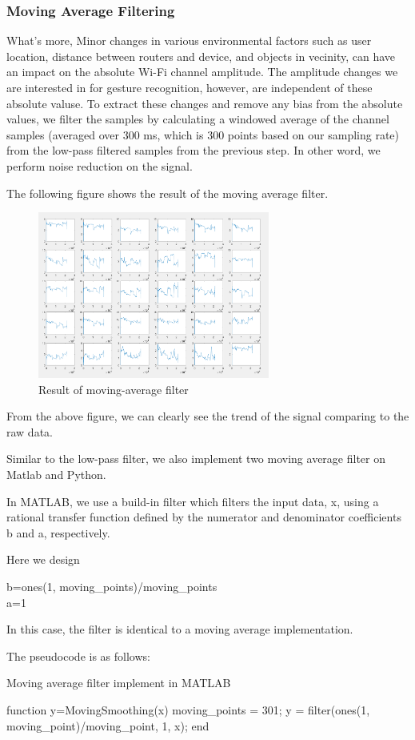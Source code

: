 \documentclass[conference]{IEEEtran}
\begin{document}
\subsubsection{Moving Average Filtering}
What's more, Minor changes in various environmental factors such as user location, distance between routers and device, and objects in vecinity, can have an impact on the absolute Wi-Fi channel amplitude. The amplitude changes we are interested in for gesture recognition, however, are independent of these absolute valuse. To extract these changes and remove any bias from the absolute values, we filter the samples by calculating a windowed average of the channel samples (averaged over 300 ms, which is 300 points based on our sampling rate) from the low-pass filtered samples from the previous step. In other word, we perform noise reduction on the signal.

The following figure shows the result of the moving average filter.
\begin{figure}[H]
\centering
\includegraphics[width=3in]{MAF.png}
\caption{Result of moving-average filter}
\end{figure}
From the above figure, we can clearly see the trend of the signal comparing to the raw data.

Similar to the low-pass filter, we also implement two moving average filter on Matlab and Python.

In MATLAB, we use a build-in filter which filters the input data, x, using a rational transfer function defined by the numerator and denominator coefficients b and a, respectively.

Here we design
\begin{algorithm}[H]
b=ones(1, moving\_points)/moving\_points\\
a=1
\end{algorithm}
In this case, the filter is identical to a moving average implementation.

The pseudocode is as follows:
\begin{algorithm}
	\caption{Moving average filter implement in MATLAB}
	\begin{algorithmic}
	\STATE function y=MovingSmoothing(x) 
	\STATE \qquad moving\_points = 301;
	\STATE \qquad y = filter(ones(1, moving\_point)/moving\_point, 1, x);
	\STATE end
	\end{algorithmic}
\end{algorithm}
\end{document}
